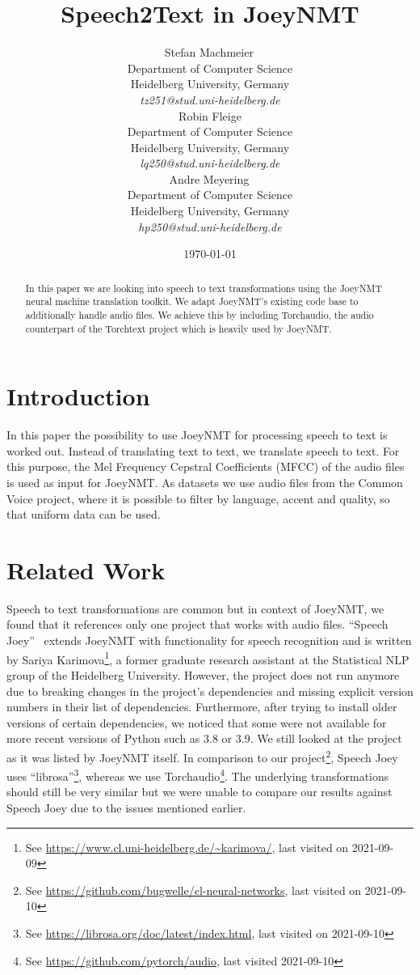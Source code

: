 \documentclass[11pt,a4paper]{article}
\title{Speech2Text in JoeyNMT}
\author{\small Stefan Machmeier\,\orcidlink{0000-0002-7028-1755} \\
  \small Department of Computer Science \\
  \small Heidelberg University, Germany \\
  \small \textit{tz251@stud.uni-heidelberg.de} \\
  \And
  \small Robin Fleige \\
  \small Department of Computer Science \\
  \small Heidelberg University, Germany \\
  \small \textit{lq250@stud.uni-heidelberg.de} \\
  \And
  \small Andre Meyering\,\orcidlink{0000-0002-7973-0369} \\
  \small Department of Computer Science \\
  \small Heidelberg University, Germany \\
  \small \textit{hp250@stud.uni-heidelberg.de} \\}
\date{\today}
\begin{document}
\maketitle
\begin{abstract}
In this paper we are looking into speech to text transformations using the JoeyNMT neural machine translation toolkit.
We adapt JoeyNMT's existing code base to additionally handle audio files.
We achieve this by including Torchaudio, the audio counterpart of the Torchtext project which is heavily used by JoeyNMT.
\end{abstract}

\section{Introduction}
In this paper the possibility to use JoeyNMT for processing speech to text is worked out.
Instead of translating text to text, we translate speech to text.
For this purpose, the Mel Frequency Cepstral Coefficients (MFCC) of the audio files is used as input for JoeyNMT.
As datasets we use audio files from the Common Voice project, where it is possible to filter by language, accent and quality, so that uniform data can be used.

\section{Related Work}

Speech to text transformations are common but in context of JoeyNMT, we found that it references only one project that works with audio files.
\enquote{Speech Joey}~\cite{speechjoey} extends JoeyNMT with functionality for speech recognition and is written by Sariya Karimova\footnote{See \url{https://www.cl.uni-heidelberg.de/~karimova/}, last visited on 2021-09-09}, a former graduate research assistant at the Statistical NLP group of the Heidelberg University.
However, the project does not run anymore due to breaking changes in the project's
dependencies and missing explicit version numbers in their list of dependencies.
Furthermore, after trying to install older versions of certain dependencies,
we noticed that some were not available for more recent versions of Python such as 3.8 or 3.9.
We still looked at the project as it was listed by JoeyNMT itself.
In comparison to our project\footnote{See \url{https://github.com/bugwelle/cl-neural-networks}, last visited on 2021-09-10}, Speech Joey uses \enquote{librosa}\footnote{See \url{https://librosa.org/doc/latest/index.html}, last visited on 2021-09-10}, whereas we use Torchaudio\footnote{See \url{https://github.com/pytorch/audio}, last visited 2021-09-10}.
The underlying transformations should still be very similar but we were unable to compare our results against Speech Joey due to the issues mentioned earlier.
\end{document}
